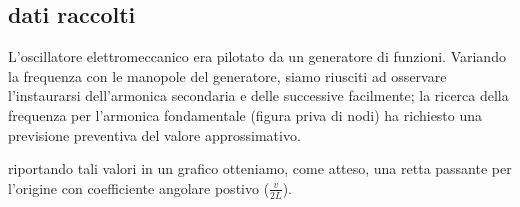 \documentclass[a4paper]{article}
\theoremstyle{definition}
\begin{document}
	\subsection{dati raccolti}
	L'oscillatore elettromeccanico era pilotato da un generatore di funzioni. Variando la frequenza con le manopole del generatore, siamo riusciti ad osservare l'instaurarsi dell'armonica secondaria e delle successive facilmente; la ricerca della frequenza per l'armonica fondamentale (figura priva di nodi) ha richiesto una previsione preventiva del valore approssimativo.
\begin{figure}[!ht]
\end{figure}

\noindent riportando tali valori in un grafico otteniamo, come atteso, una retta passante per l'origine con coefficiente angolare postivo (\(\frac{v}{2L}\)).

\begin{figure}[!ht]
\end{figure}
\end{document}
